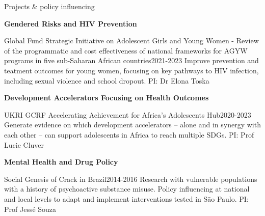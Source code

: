 \begin{rSection}{Projects \& policy influencing}
\begin{etaremune}
\vspace{1em}
\item \textbf{Gendered Risks and HIV Prevention}

\begin{rSubsection}
{Global Fund Strategic Initiative on Adolescent Girls and Young Women - Review of the programmatic and cost effectiveness of national frameworks for AGYW programs in five sub-Saharan African countries}{2021-2023}
{Improve prevention and teatment outcomes for young women, focusing on key pathways to HIV infection, including sexual violence and school dropout. PI: Dr Elona Toska}\par
\end{rSubsection}

\vspace{1em}
\item \textbf{Development Accelerators Focusing on Health Outcomes}\par

\begin{rSubsection}
{UKRI GCRF Accelerating Achievement for Africa's Adolescents Hub}{2020-2023}
{Generate evidence on which development accelerators – alone and in synergy with each other – can support adolescents in Africa to reach multiple SDGs. PI: Prof Lucie Cluver}\par
\end{rSubsection}

\vspace{1em}
\item  \textbf{Mental Health and Drug Policy}\par

\begin{rSubsection}
{Social Genesis of Crack in Brazil}{2014-2016}
{Research with vulnerable populations with a history of psychoactive substance misuse. Policy influencing at national and local levels to adapt and implement interventions tested in São Paulo. PI: Prof Jessé Souza}\par
\end{rSubsection}

\end{etaremune}
\end{rSection}